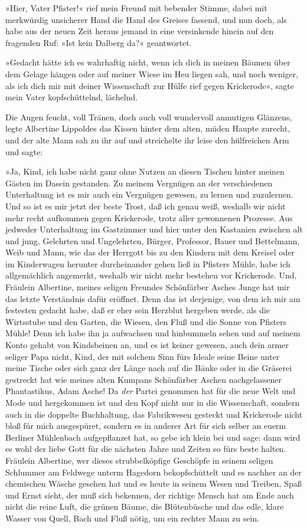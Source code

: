 »Hier, Vater Pfister!« rief mein Freund mit bebender Stimme, dabei
mit merkwürdig unsicherer Hand die Hand des Greises fassend, und
nun doch, als habe aus der neuen Zeit heraus jemand in eine
versinkende hinein auf den fragenden Ruf: »Ist kein Dalberg da?«
geantwortet.

»Gedacht hätte ich es wahrhaftig nicht, wenn ich dich in meinen
Bäumen über dem Gelage hängen oder auf meiner Wiese im Heu liegen
sah, und noch weniger, als ich dich mir mit deiner Wissenschaft zur
Hülfe rief gegen Krickerode«, sagte mein Vater kopfschüttelnd,
lächelnd.

Die Augen feucht, voll Tränen, doch auch voll wundervoll anmutigen
Glänzens, legte Albertine Lippoldes das Kissen hinter dem alten,
müden Haupte zurecht, und der alte Mann sah zu ihr auf und
streichelte ihr leise den hülfreichen Arm und sagte:

»Ja, Kind, ich habe nicht ganz ohne Nutzen an diesen Tischen hinter
meinen Gästen im Dasein gestanden. Zu meinem Vergnügen an der
verschiedenen Unterhaltung ist es mir auch ein Vergnügen gewesen,
zu lernen und zuzulernen. Und so ist es mir jetzt der beste Trost,
daß ich genau weiß, weshalb wir nicht mehr recht aufkommen gegen
Krickerode, trotz aller gewonnenen Prozesse. Aus jedweder
Unterhaltung im Gastzimmer und hier unter den Kastanien zwischen
alt und jung, Gelehrten und Ungelehrten, Bürger, Professor, Bauer
und Bettelmann, Weib und Mann, wie das der Herrgott bis zu den
Kindern mit dem Kreisel oder im Kinderwagen herunter durcheinander
gehen ließ in Pfisters Mühle, habe ich allgemächlich angemerkt,
weshalb wir nicht mehr bestehen vor Krickerode. Und, Fräulein
Albertine, meines seligen Freundes Schönfärber Asches Junge hat mir
das letzte Verständnis dafür eröffnet. Denn das ist derjenige, von
dem ich mir am festesten gedacht habe, daß er eher sein Herzblut
hergeben werde, als die Wirtsstube und den Garten, die Wiesen, den
Fluß und die Sonne von Pfisters Mühle! Denn ich habe ihn ja
aufwachsen und hinbummeln sehen und auf meinem Konto gehabt von
Kindsbeinen an, und es ist keiner gewesen, auch dein armer seliger
Papa nicht, Kind, der mit solchem Sinn fürs Ideale seine Beine
unter meine Tische oder sich ganz der Länge nach auf die Bänke oder
in die Gräserei gestreckt hat wie meines alten Kumpans Schönfärber
Aschen nachgelassener Phantastikus, Adam Asche! Da \emph{der}
Partei genommen hat für die neue Welt und Mode und hergekommen ist
und den Kopf nicht nur in die Wissenschaft, sondern auch in die
doppelte Buchhaltung, das Fabrikwesen gesteckt und Krickerode nicht
bloß für mich ausgespüret, sondern es in anderer Art für sich
selber an euerm Berliner Mühlenbach aufgepflanzet hat, so gebe ich
klein bei und sage: dann wird es wohl der liebe Gott für die
nächsten Jahre und Zeiten so fürs beste halten. Fräulein Albertine,
wer dieses strubbelköpfige Geschöpfe in seinem seligen Schlummer am
Feldwege unterm Hagedorn bekopfschüttelt und es nachher an der
chemischen Wäsche gesehen hat und es heute in seinem Wesen und
Treiben, Spaß und Ernst sieht, der muß sich bekennen, der richtige
Mensch hat am Ende auch nicht die reine Luft, die grünen Bäume, die
Blütenbüsche und das edle, klare Wasser von Quell, Bach und Fluß
nötig, um ein rechter Mann zu sein.

